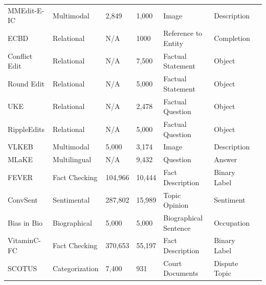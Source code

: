 \documentclass[acmsmall, screen]{acmart}
\begin{document}
\begin{table}[!t]
{\begin{tabular}{l|llllll}
MMEdit-E-IC&Multimodal& 2,849& 1,000&Image&Description&\cite{cheng2023can}\\
ECBD&Relational&N/A&1000&Reference to Entity&Completion&\cite{EKP}\\
{Conflict Edit} & {Relational} & {N/A} & {7,500} & {Factual Statement} & {Object} & {\cite{li2024unveiling}} \\ 
{Round Edit} & {Relational} & {N/A} & {5,000} & {Factual Statement} & {Object} & {\cite{li2024unveiling}} \\ 
{UKE} & {Relational} & {N/A} & {2,478} & {Factual Question} & {Object} & {\cite{wu2024updating}} \\ 
{RippleEdits} & {Relational} & {N/A} & {5,000} & {Factual Question} & {Object} & {\cite{cohen2024evaluating,jiang2024learning}} \\ 
{VLKEB} & {Multimodal} & {5,000} & {3,174} & {Image} & {Description} & {\cite{huang2024kebench}} \\ 
{MLaKE} & {Multilingual} & {N/A} & {9,432} & {Question} & {Answer} & {\cite{wei2024mlake}} \\ \hline
FEVER& Fact Checking & 104,966 & 10,444& Fact Description& Binary Label & \cite{cao2021editing,mitchell2022fast,Transformer-Patcher,p4}\\
ConvSent& Sentimental &  287,802 &15,989 & Topic Opinion & Sentiment &\cite{SERAC} \\
Bias in Bio& Biographical &5,000&5,000& Biographical Sentence & Occupation & \cite{hernandez2023measuring}\\
VitaminC-FC&  Fact Checking & 370,653&55,197& Fact Description& Binary Label & \cite{SERAC}\\
SCOTUS&Categorization&7,400&931&Court Documents&Dispute Topic&\cite{hartvigsen2022aging,yu2024melo}\\
\midrule[1pt]
\end{tabular}}
\vspace{-.15in}
\label{tab:dataset}
\end{table}
\end{document}
